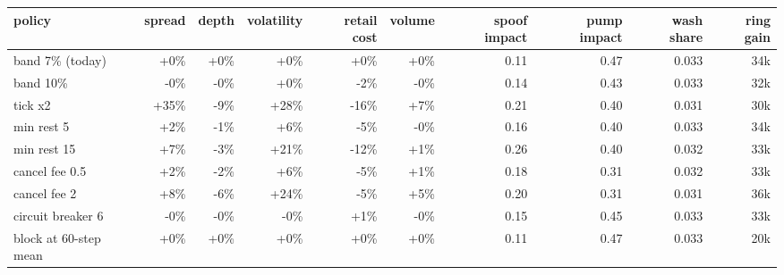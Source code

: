 \begin{tabular}{lrrrrrrrrr}
\toprule
policy & spread & depth & volatility & retail cost & volume & spoof impact & pump impact & wash share & ring gain \\
\midrule
band 7\% (today) & +0\% & +0\% & +0\% & +0\% & +0\% & 0.11 & 0.47 & 0.033 & 34k \\
band 10\% & -0\% & -0\% & +0\% & -2\% & -0\% & 0.14 & 0.43 & 0.033 & 32k \\
tick x2 & +35\% & -9\% & +28\% & -16\% & +7\% & 0.21 & 0.40 & 0.031 & 30k \\
min rest 5 & +2\% & -1\% & +6\% & -5\% & -0\% & 0.16 & 0.40 & 0.033 & 34k \\
min rest 15 & +7\% & -3\% & +21\% & -12\% & +1\% & 0.26 & 0.40 & 0.032 & 33k \\
cancel fee 0.5 & +2\% & -2\% & +6\% & -5\% & +1\% & 0.18 & 0.31 & 0.032 & 33k \\
cancel fee 2 & +8\% & -6\% & +24\% & -5\% & +5\% & 0.20 & 0.31 & 0.031 & 36k \\
circuit breaker 6 & -0\% & -0\% & -0\% & +1\% & -0\% & 0.15 & 0.45 & 0.033 & 33k \\
block at 60-step mean & +0\% & +0\% & +0\% & +0\% & +0\% & 0.11 & 0.47 & 0.033 & 20k \\
\bottomrule
\end{tabular}
